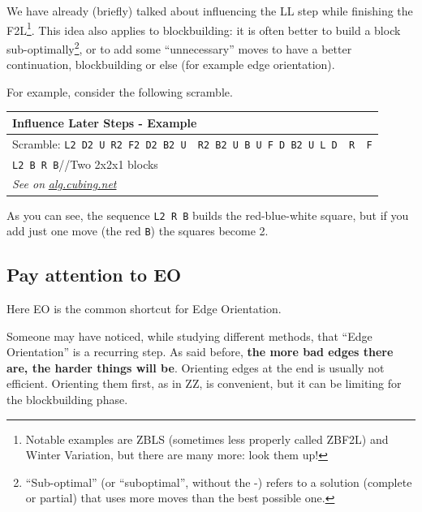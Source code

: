 \documentclass[11pt,a4paper]{book}
\newcommand{\p}{\textquotesingle}
\newcommand{\m}{\texttt}
\newcommand{\ps}{\p\,\,}
\newcommand{\comment}[1]{{\color{gray}\quad//#1}}
\begin{document}
We have already (briefly) talked about influencing the LL step while finishing the F2L\footnote{Notable examples are ZBLS (sometimes less properly called ZBF2L) and Winter Variation, but there are many more: look them up!}. This idea also applies to blockbuilding: it is often better to build a block sub-optimally\footnote{``Sub-optimal'' (or ``suboptimal'', without the -) refers to a solution (complete or partial) that uses more moves than the best possible one.}, or to add some ``unnecessary'' moves to have a better continuation, blockbuilding or else (for example edge orientation).

For example, consider the following scramble.

\bigskip
\begin{tabular}{|p{}|}
\hline
\textbf{Influence Later Steps - Example}\\
\hline
Scramble: \m{L2 D2 U R2 F2 D2 B2 U\ps R2 B2 U B U F D B2 U L D\ps R\ps F}\\
\hline
\begin{minipage}[l]{0.650\textwidth}
\m{L2 {\color{red}B} R B}\comment{Two 2x2x1 blocks}
\end{minipage}
\begin{minipage}[c]{0.25\textwidth}

\end{minipage}\\
\hline
\emph{See on }\href{https://alg.cubing.net/?setup=L2_D2_U_R2_F2_D2_B2_U-_R2_B2_U_B_U_F_D_B2_U_L_D-_R-_F&alg=L2_B_R_B_\%2F\%2FTwo_2x2x1_blocks}{\emph{alg.cubing.net}}\\
\hline
\end{tabular}
\bigskip

As you can see, the sequence \m{L2 R B} builds the red-blue-white square, but if you add just one move (the red \m{B}) the squares become 2.

\subsection{Pay attention to EO}
\label{EO_attention}

Here EO is the common shortcut for Edge Orientation.

Someone may have noticed, while studying different methods, that “Edge Orientation” is a recurring step. As said before, \textbf{the more bad edges there are, the harder things will be}. Orienting edges at the end is usually not efficient. Orienting them first, as in ZZ, is convenient, but it can be limiting for the blockbuilding phase.
\end{document}
